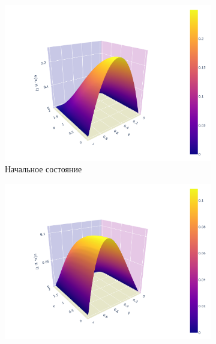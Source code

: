 \documentclass[a4paper]{article}
\begin{document}
\begin{figure}[H]
\centering
\begin{subfigure}{0.4\textwidth}
 \includegraphics[width=\textwidth,keepaspectratio=true]{start.pdf}
 
 \caption{Начальное состояние}
\end{subfigure}
\begin{subfigure}{0.4\textwidth}
 \includegraphics[width=\textwidth,keepaspectratio=true]{middle.pdf}
 

\end{subfigure}
\end{figure}
\end{document}
